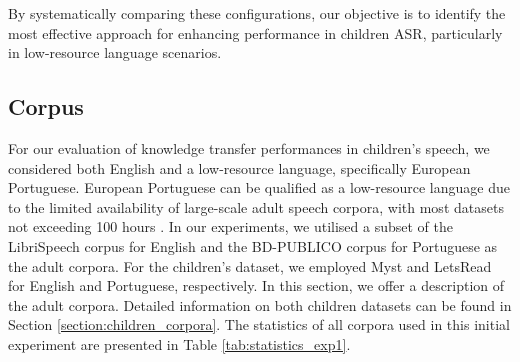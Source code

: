 By systematically comparing these configurations, our objective is to identify the most effective approach for enhancing performance in children \ac{ASR}, particularly in low-resource language scenarios.


\subsection{Corpus}
\label{sec:corpus}
For our evaluation of knowledge transfer performances in children's speech, we considered both English and a low-resource language, specifically European Portuguese. European Portuguese can be qualified as a low-resource language due to the limited availability of large-scale adult speech corpora, with most datasets not exceeding 100 hours \cite{tribus}.
In our experiments, we utilised a subset of the LibriSpeech corpus for English and the BD-PUBLICO corpus for Portuguese as the adult corpora. For the children's dataset, we employed Myst and LetsRead for English and Portuguese, respectively. In this section, we offer a description of the adult corpora. Detailed information on both children datasets can be found in Section  \ref{section:children_corpora}. The statistics of all corpora used in this initial experiment are presented in Table \ref{tab:statistics_exp1}.


